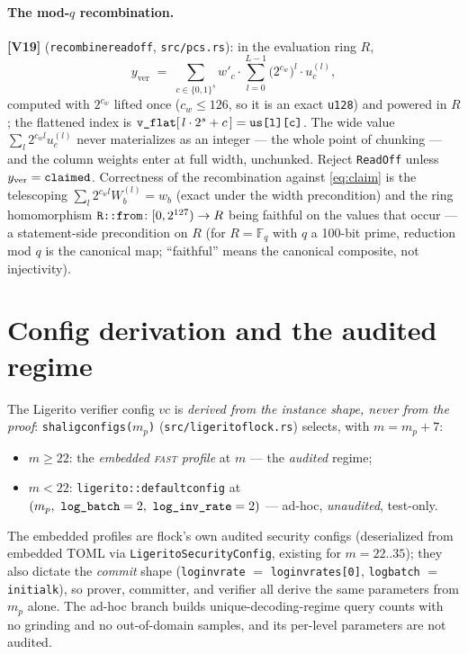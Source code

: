 \documentclass[11pt]{article}
\newcommand{\F}{\mathbb{F}}
\newcommand{\Fq}{\F_q}                 %
\newcommand{\bits}{\{0,1\}}
\newcommand{\cw}{c_w}
\newcommand{\code}[1]{{\def\_{\textunderscore\allowbreak}\texttt{#1}}}
\newcommand{\Vc}[1]{\textbf{[V#1]}}    %
\begin{document}
\paragraph{The mod-$q$ recombination.}  \Vc{19}
(\code{recombine\_read\_off}, \code{src/pcs.rs}): in the evaluation ring
$R$,
\[
  y_{\mathrm{ver}} \;=\; \sum_{c \in \bits^s} w'_c \cdot
  \sum_{l=0}^{L-1} \big(2^{\cw}\big)^{l} \cdot u^{(l)}_c ,
\]
computed with $2^{\cw}$ lifted once ($\cw \le 126$, so it is an exact
\code{u128}) and powered in $R$; the flattened index is
$\code{v\_flat}[\,l \cdot 2^s + c\,] = \code{us[l][c]}$.  The wide value
$\sum_l 2^{\cw l} u^{(l)}_c$ never materializes as an integer — the whole
point of chunking — and the column weights enter at full width,
unchunked.  Reject \code{ReadOff} unless $y_{\mathrm{ver}} =
\code{claimed}$.  Correctness of the recombination against
\eqref{eq:claim} is the telescoping
$\sum_l 2^{\cw l} W^{(l)}_b = w_b$ (exact under the width precondition)
and the ring homomorphism $\code{R::from} \colon [0, 2^{127}) \to R$
being faithful on the values that occur — a statement-side precondition
on $R$ (for $R = \Fq$ with $q$ a 100-bit prime, reduction mod $q$ is the
canonical map; ``faithful'' means the canonical composite, not
injectivity).

\section{Config derivation and the audited regime}
\label{sec:config}

The Ligerito verifier config $\mathit{vc}$ is \emph{derived from the
instance shape, never from the proof}:
\code{sha\_lig\_configs($m_p$)} (\code{src/ligerito\_flock.rs}) selects,
with $m = m_p + 7$:
\begin{itemize}[itemsep=1pt]
\item $m \ge 22$: the \emph{embedded \textsc{fast} profile} at $m$ — the
  \emph{audited} regime;
\item $m < 22$: \code{ligerito::default\_config} at
  $(m_p,\ \code{log\_batch}=2,\ \code{log\_inv\_rate}=2)$ — ad-hoc,
  \emph{unaudited}, test-only.
\end{itemize}
The embedded profiles are flock's own audited security configs
(deserialized from embedded TOML via \code{LigeritoSecurityConfig},
existing for $m = 22..35$); they also dictate the \emph{commit} shape
(\code{log\_inv\_rate} $=$ \code{log\_inv\_rates[0]},
\code{log\_batch} $=$ \code{initial\_k}), so prover, committer, and
verifier all derive the same parameters from $m_p$ alone.  The ad-hoc
branch builds unique-decoding-regime query counts with no grinding and no
out-of-domain samples, and its per-level parameters are not audited.
\end{document}
